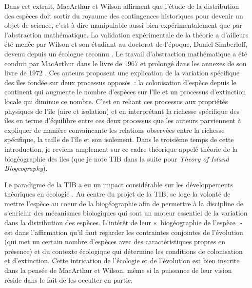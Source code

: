 Dans cet extrait, MacArthur et Wilson affirment que l'étude de la
distribution des espèces doit sortir du royaume des contingences
historiques pour devenir un objet de science, c'est-à-dire manipulable
aussi bien expérimentalement que par l'abstraction mathématique. La
validation expérimentale de la théorie a d'ailleurs été menée par Wilson
et son étudiant au doctorat de l'époque, Daniel Simberloff, devenu
depuis un écologue reconnu \citep{Simberloff1969}. Le travail
d'abstraction mathématique a été conduit par MacArthur dans le livre de
1967 et prolongé dans les annexes de son livre de 1972
\citep{macarthur1972geographical}. Ces auteurs proposent une explication
de la variation spécifique des îles fondée sur deux processus opposés~:
la colonisation d'espèce depuis le continent qui augmente le nombre
d'espèces sur l'île et un processus d'extinction locale qui diminue ce
nombre. C'est en reliant ces processus aux propriétés physiques de l'île
(aire et isolation) et en interprétant la richesse spécifique des îles
en terme d'équilibre entre ces deux processus que les auteurs
parviennent à expliquer de manière convaincante les relations observées
entre la richesse spécifique, la taille de l'île et son isolement. Dans
le troisième temps de cette introduction, je reviens amplement sur ce
cadre théorique appelé théorie de la biogéographie des îles (que je note
TIB dans la suite pour \emph{Theory of Island Biogeography}).

Le paradigme de la TIB a eu un impact considérable sur les
développements théoriques en écologie \citep{Warren2015}. Au centre du
projet de la TIB, se loge la volonté de mettre l'espèce au coeur de la
biogéographie afin de permettre à la discipline de s'enrichir des
mécanismes biologiques qui sont un moteur essentiel de la variation dans
la distribution des espèces. L'intérêt de leur «~biogéographie de
l'espèce~» \citep[le terme est mentionné à l'avant-dernière phrase de
l'ouvrage][p.183]{MacArthur1967} est dans l'affirmation qu'il faut
regarder les contraintes conjointes de l'évolution (qui met un certain
nombre d'espèces avec des caractéristiques propres en présence) et du
contexte écologique qui détermine les conditions de colonisation et
d'extinction. Cette intrication de l'écologie et de l'évolution est bien
inscrite dans la pensée de MacArthur et Wilson, même si la puissance de
leur vision réside dans le fait de les occulter en partie.

